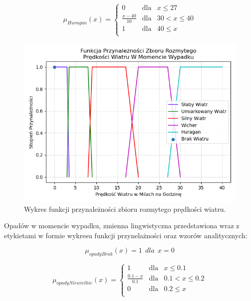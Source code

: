 \documentclass{classrep}
\begin{document}
\begin{equation}
\mu _{Huragan}(x) =  \left\{ \begin{array}{rcl}
 0 & \mbox{dla} & x \leq 27 \\
\frac{x - 40}{10} & \mbox{dla} & 30 < x \leq 40\\
1 & \mbox{dla} & 40 \leq x\\
\end{array}\right.
\end{equation}

\begin{figure}[h!]
 \centering
 \includegraphics[width=14cm]{FunkcjaPrzynaleznosciPredkoscWiatru.png}
 \vspace{-0.3cm}
 \caption{Wykres funkcji przynależności zbioru rozmytego prędkości wiatru. }
 \label{rysunek do eksperymentu 1 wariantu 1}
\end{figure}
\newpage



Opadów w momencie wypadku, zmienna lingwistyczna przedstawiona wraz z etykietami w formie wykresu funkcji przynelażności oraz wzorów analitycznych:

\begin{equation}
\mu _{opadyBrak}(x) =   1 \ \ dla \ \ x  = 0
\end{equation}

\begin{equation}
\mu _{opadyNiewielkie}(x) =  \left\{ \begin{array}{rcl}
 1 & \mbox{dla} & x  \leq 0.1 \\
\frac{0.1- x}{0.1} & \mbox{dla} & 0.1 < x \leq 0.2\\
0 & \mbox{dla} & 0.2 \leq x\\
\end{array}\right.
\end{equation}
\end{document}
